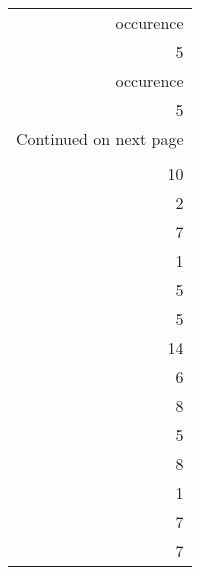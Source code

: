 \begin{longtable}{r}
\toprule
 occurence \\
         5 \\
\midrule
\endfirsthead

\toprule
 occurence \\
         5 \\
\midrule
\endhead
\midrule
\multicolumn{1}{r}{{Continued on next page}} \\
\midrule
\endfoot

\bottomrule
\endlastfoot
         2 \\
        10 \\
         2 \\
         7 \\
         1 \\
         5 \\
         5 \\
        14 \\
         6 \\
         8 \\
         5 \\
         8 \\
         1 \\
         7 \\
         7 \\
\end{longtable}

